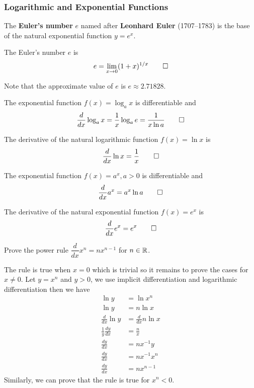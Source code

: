 \subsubsection{Logarithmic and Exponential Functions}
The \textbf{Euler's number} \(e\) named after \textbf{Leonhard Euler} (1707--1783)
is the base of the natural exponential function \(y=e^x\).
\begin{definition}
    The Euler's number \(e\) is \[e=\lim_{x\to 0}(1+x)^{1/x}\qedhere\]
\end{definition}
Note that the approximate value of \(e\) is \(e\approx2.71828\).
\begin{theorem}
    The exponential function \(f(x)=\log_a x\) is differentiable and
    \[\frac{d}{dx}\log_a x=\frac{1}{x}\log_a e=\frac{1}{x\ln a}\qedhere\]
\end{theorem}
\begin{theorem}
    The derivative of the natural logarithmic function \(f(x)=\ln x\) is
    \[\frac{d}{dx}\ln x=\frac{1}{x}\qedhere\]
\end{theorem}
\begin{theorem}
    The exponential function \(f(x)=a^x,a>0\) is differentiable and
    \[\frac{d}{dx}a^x=a^x\ln a\qedhere\]
\end{theorem}
\begin{theorem}
    The derivative of the natural exponential function \(f(x)=e^x\) is
    \[\frac{d}{dx}e^x=e^x\qedhere\]
\end{theorem}
\begin{problem}
    Prove the power rule \(\dfrac{d}{dx}x^n=nx^{n-1}\) for \(n\in\mathbb{R}\).
\end{problem}
\begin{solution}
    The rule is true when \(x=0\) which is trivial so it remains to prove the
    cases for \(x\neq 0\).
    Let \(y=x^n\) and \(y>0\), we use implicit differentiation and logarithmic
    differentiation then we have
    \begin{align*}
        \ln y &= \ln x^n \\ \ln y &= n\ln x \\
        \frac{d}{dx}\ln y &= \frac{d}{dx}n\ln x \\
        \frac{1}{y}\frac{dy}{dx} &= \frac{n}{x} \\
        \frac{dy}{dx} &= nx^{-1}y \\ \frac{dy}{dx} &= nx^{-1}x^n \\
        \frac{dy}{dx} &= nx^{n-1}
    \end{align*}
    Similarly, we can prove that the rule is true for \(x^n<0\).
\end{solution}

